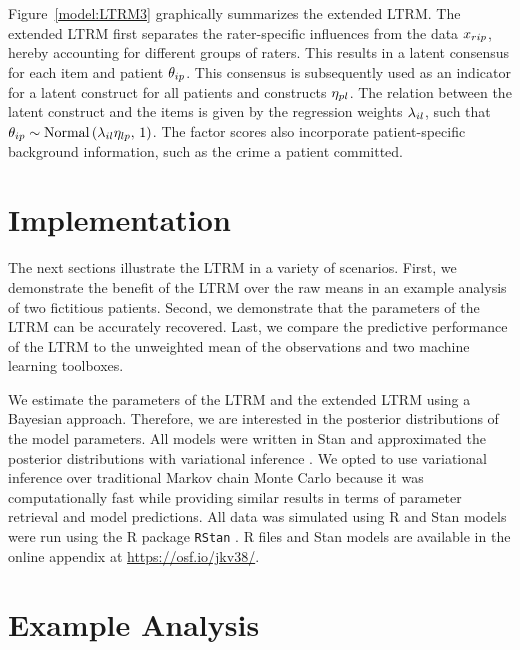 \documentclass[a4paper]{article}
\newcommand{\code}[1]{\texttt{#1}}
\newcommand{\osflink}{\url{https://osf.io/jkv38/}}
\begin{document}
Figure~\ref{model:LTRM3} graphically summarizes the extended LTRM. The extended LTRM first separates the rater-specific influences from the data $x_{rip}$, hereby accounting for different groups of raters. This results in a latent consensus for each item and patient $\theta_{ip}$. This consensus is subsequently used as an indicator for a latent construct for all patients and constructs $\eta_{pl}$. The relation between the latent construct and the items is given by the regression weights $\lambda_{il}$, such that $\theta_{ip} \sim \text{Normal}\left(\lambda_{il}\eta_{lp},\,1\right)$. The factor scores also incorporate patient-specific background information, such as the crime a patient committed.

\section*{Implementation}
The next sections illustrate the LTRM in a variety of scenarios. First, we demonstrate the benefit of the LTRM over the raw means in an example analysis of two fictitious patients. Second, we demonstrate that the parameters of the LTRM can be accurately recovered. Last, we compare the predictive performance of the LTRM to the unweighted mean of the observations and two machine learning toolboxes.

We estimate the parameters of the LTRM and the extended LTRM using a Bayesian approach. Therefore, we are interested in the posterior distributions of the model parameters. All models were written in Stan and approximated the posterior distributions with variational inference \cite{CarpenterEtAl2017Stan}. We opted to use variational inference over traditional Markov chain Monte Carlo because it was computationally fast while providing similar results in terms of parameter retrieval and model predictions. All data was simulated using R \cite{R} and Stan models were run using the R package \code{RStan} \cite{rstan2019a2192}. R files and Stan models are available in the online appendix at \osflink{}.

\section*{Example Analysis}
\end{document}
